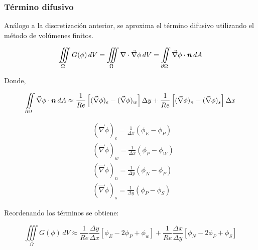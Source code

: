 \subsubsection{Término difusivo}

Análogo a la discretización anterior, se aproxima el término difusivo utilizando el método de volúmenes finitos.

\begin{equation}
\iiint\limits_{\Omega} G(\phi) \, dV = \iiint\limits_{\Omega} \nabla \cdot \vec{\nabla} \phi \, dV = \iint\limits_{\partial \Omega} \vec{\nabla} \phi \cdot \boldsymbol{n} \, dA 
\end{equation}

Donde,

\begin{equation}
\iint\limits_{\partial \Omega} \vec{\nabla} \phi \cdot \boldsymbol{n} \, dA \approx \dfrac{1}{Re} \left[ (\vec{\nabla} \phi)_e - (\vec{\nabla} \phi)_w \right] \Delta y + \dfrac{1}{Re} \left[ (\vec{\nabla} \phi)_n - (\vec{\nabla} \phi)_s \right] \Delta x
\end{equation}

\begin{equation}
\begin{split}
&(\vec{\nabla} \phi)_e = \frac{1}{\Delta x}(\phi_E-\phi_P) \\
&(\vec{\nabla} \phi)_w = \frac{1}{\Delta x}(\phi_P-\phi_W) \\
&(\vec{\nabla} \phi)_n = \frac{1}{\Delta y}(\phi_N-\phi_P) \\
&(\vec{\nabla} \phi)_s = \frac{1}{\Delta y}(\phi_P-\phi_S)
\end{split}
\end{equation}

Reordenando los términos se obtiene:

\begin{equation}
\iiint\limits_{\Omega} G(\phi) \, dV \approx \dfrac{1}{Re} \dfrac{\Delta y}{\Delta x} \left[ \phi_E - 2\phi_P + \phi_w \right] + \dfrac{1}{Re} \dfrac{\Delta x}{\Delta y} \left[ \phi_N - 2\phi_P + \phi_S \right]
\end{equation}
